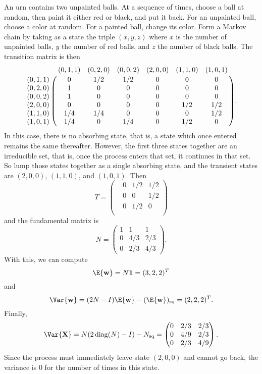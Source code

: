 \documentclass[12pt]{article}
\begin{document}
\begin{example}
    An urn contains two unpainted balls.  At a sequence of times, choose
    a ball at random, then paint it either red or black, and put it
    back. For an unpainted ball, choose a color at random.  For a
    painted ball, change its color.  Form a Markov chain by taking as a
    state the triple \( (x,y,z) \) where \( x \) is the number of
    unpainted balls, \( y \) the number of red balls, and \( z \) the
    number of black balls.  The transition matrix is then
    \[
        \bordermatrix{ & (0,1,1) & (0,2,0) & (0,0,2) & (2,0,0) & (1,1,0)
        & (1,0,1) \cr
        (0,1,1) & 0 & 1/2 & 1/2 & 0 & 0 & 0 \cr
        (0,2,0) & 1 & 0 & 0 & 0 & 0 & 0 \cr
        (0,0,2) & 1 & 0 & 0 & 0 & 0 & 0 \cr
        (2,0,0) & 0 & 0 & 0 & 0 & 1/2 & 1/2 \cr
        (1,1,0) & 1/4 & 1/4 & 0 & 0 & 0 & 1/2 \cr
        (1,0,1) & 1/4 & 0 & 1/4 & 0 & 1/2 & 0 \cr
        }.
    \] In this case, there is no absorbing state, that is, a state which
    once entered remains the same thereafter.  However, the first three
    states together are an irreducible set, that is, once the process enters
    that set, it continues in that set.  So lump those states together
    as a single absorbing state, and the transient states are \( (2,0,0)
    \), \( (1,1,0) \), and \( (1,0,1) \).  Then
    \[
        T =
        \begin{pmatrix}
            & 0 & 1/2 & 1/2 \\
            & 0 & 0 & 1/2 \\
            & 0 & 1/2 & 0 \\
        \end{pmatrix}
    \] and the fundamental matrix is
    \[
        N =
        \begin{pmatrix}
            1 & 1 & 1\\
            0 & 4/3 & 2/3\\
            0 & 2/3 & 4/3
        \end{pmatrix}
        .
    \] With this, we can compute
    \[
        \E{\mathbf{w}} = N \mathbf{1} = (3, 2, 2)^T
    \] and
    \[
        \Var{\mathbf{w}} = (2N-I)\E{\mathbf{w}}-(\E{\mathbf{w}})_{\text{sq}}
        = (2,2,2)^T.
    \] Finally,
    \[
        \Var{\mathbf{X}} = N(2
        \operatorname{diag}
        (N) - I) - N_{\text{sq}} =
        \begin{pmatrix}
            0 & 2/3 & 2/3 \\
            0 & 4/9 & 2/3 \\
            0 & 2/3 & 4/9
        \end{pmatrix}
        .
    \] Since the process must immediately leave state \( (2,0,0) \) and
    cannot go back, the variance is \( 0 \) for the number of times in
    this state.
\end{example}
\end{document}
